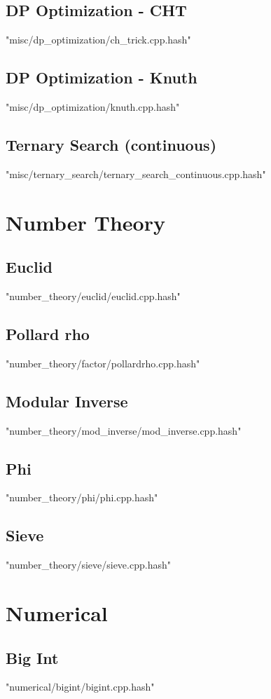 \documentclass [12pt,onecolumn,oneside]{article}
\begin{document}
\subsection{ DP Optimization - CHT}
 {"misc/dp_optimization/ch_trick.cpp.hash"}
\subsection{ DP Optimization - Knuth}
 {"misc/dp_optimization/knuth.cpp.hash"}
\subsection{ Ternary Search (continuous)}
 {"misc/ternary_search/ternary_search_continuous.cpp.hash"}
\newpage

\section{Number Theory}
\subsection{ Euclid}
 {"number_theory/euclid/euclid.cpp.hash"}
\subsection{ Pollard rho}
 {"number_theory/factor/pollardrho.cpp.hash"}
\subsection{ Modular Inverse}
 {"number_theory/mod_inverse/mod_inverse.cpp.hash"}
\subsection{ Phi}
 {"number_theory/phi/phi.cpp.hash"}
\subsection{ Sieve}
 {"number_theory/sieve/sieve.cpp.hash"}
\newpage

\section{Numerical}
\subsection{ Big Int}
 {"numerical/bigint/bigint.cpp.hash"}
\end{document}
